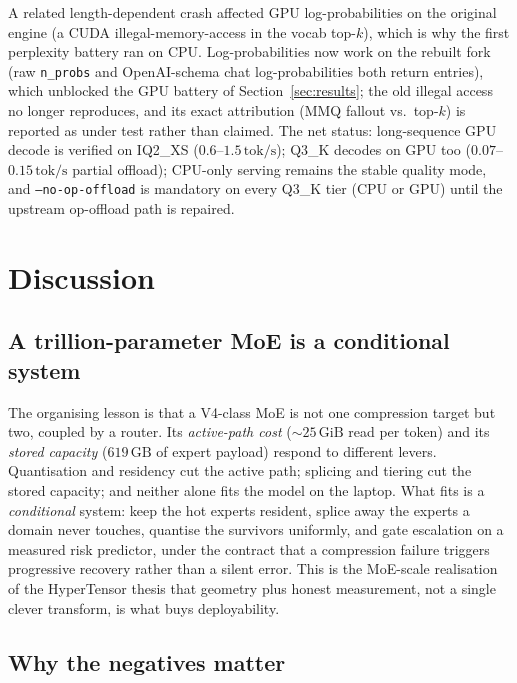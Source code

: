 \documentclass[11pt]{article}
\newcommand{\code}[1]{\texttt{#1}}
\newcommand{\gib}{\,\textrm{GiB}}
\newcommand{\gb}{\,\textrm{GB}}
\newcommand{\tps}{\,\textrm{tok/s}}
\begin{document}
A related length-dependent crash affected GPU log-probabilities on the original
engine (a CUDA illegal-memory-access in the vocab top-$k$), which is why the
first perplexity battery ran on CPU. Log-probabilities now work on the rebuilt
fork (raw \code{n\_probs} and OpenAI-schema chat log-probabilities both return
entries), which unblocked the GPU battery of Section~\ref{sec:results}; the old
illegal access no longer reproduces, and its exact attribution (MMQ fallout
vs.\ top-$k$) is reported as under test rather than claimed. The net status:
long-sequence GPU decode is verified on IQ2\_XS ($0.6$--$1.5\tps{}$); Q3\_K
decodes on GPU too ($0.07$--$0.15\tps{}$ partial offload); CPU-only serving
remains the stable quality mode, and \code{--no-op-offload} is mandatory on
every Q3\_K tier (CPU or GPU) until the upstream op-offload path is repaired.

\section{Discussion}
\label{sec:discussion}

\subsection{A trillion-parameter MoE is a conditional system}

The organising lesson is that a V4-class MoE is not one compression target but
two, coupled by a router. Its \emph{active-path cost} (${\sim}25\gib{}$ read per
token) and its \emph{stored capacity} ($619\gb{}$ of expert payload) respond to
different levers. Quantisation and residency cut the active path; splicing and
tiering cut the stored capacity; and neither alone fits the model on the laptop.
What fits is a \emph{conditional} system: keep the hot experts resident, splice
away the experts a domain never touches, quantise the survivors uniformly, and
gate escalation on a measured risk predictor, under the contract that a
compression failure triggers progressive recovery rather than a silent error.
This is the MoE-scale realisation of the HyperTensor thesis that geometry plus
honest measurement, not a single clever transform, is what buys deployability.

\subsection{Why the negatives matter}
\end{document}
